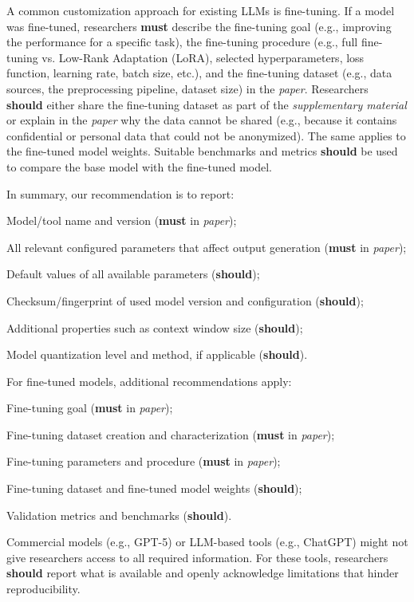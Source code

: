 \documentclass[smallextended]{svjour3}
\newcommand{\must}{\textbf{must}\xspace}
\newcommand{\should}{\textbf{should}\xspace}
\newcommand{\paper}{\emph{paper}\xspace}
\newcommand{\supplementarymaterial}{\emph{supplementary material}\xspace}
\newcommand{\paper}{\emph{paper}\xspace}
\newcommand{\supplementarymaterial}{\emph{supplementary material}\xspace}
\begin{document}
A common customization approach for existing LLMs is fine-tuning.
If a model was fine-tuned, researchers \must describe the fine-tuning goal (e.g., improving the performance for a specific task), the fine-tuning procedure (e.g., full fine-tuning vs. Low-Rank Adaptation (LoRA), selected hyperparameters, loss function, learning rate, batch size, etc.), and the fine-tuning dataset (e.g., data sources, the preprocessing pipeline, dataset size) in the \paper.
Researchers \should either share the fine-tuning dataset as part of the \supplementarymaterial or explain in the \paper why the data cannot be shared (e.g., because it contains confidential or personal data that could not be anonymized).
The same applies to the fine-tuned model weights.
Suitable benchmarks and metrics \should be used to compare the base model with the fine-tuned model.

In summary, our recommendation is to report:
\begin{enumerate*}[label=(\arabic*)]
\item Model/tool name and version (\must in \paper);
\item All relevant configured parameters that affect output generation (\must in \paper);
\item Default values of all available parameters (\should);
\item Checksum/fingerprint of used model version and configuration (\should);
\item Additional properties such as context window size (\should);
\item Model quantization level and method, if applicable (\should).
\end{enumerate*}

For fine-tuned models, additional recommendations apply:
\begin{enumerate*}[label=(\arabic*)]
\item Fine-tuning goal (\must in \paper);
\item Fine-tuning dataset creation and characterization (\must in \paper);
\item Fine-tuning parameters and procedure (\must in \paper);
\item Fine-tuning dataset and fine-tuned model weights (\should);
\item Validation metrics and benchmarks (\should).
\end{enumerate*}

Commercial models (e.g., GPT-5) or LLM-based tools (e.g., ChatGPT) might not give researchers access to all required information.
For these tools, researchers \should report what is available and openly acknowledge limitations that hinder reproducibility.
\end{document}
